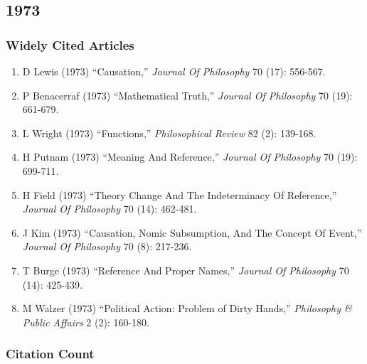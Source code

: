 \documentclass[
  10pt,
  letterpaper,
  DIV=11,
  numbers=noendperiod,
  twoside]{scrartcl}
\providecommand{\tightlist}{%
  \setlength{\itemsep}{0pt}\setlength{\parskip}{0pt}}\usepackage{longtable,booktabs,array}
\begin{document}
\newpage

\subsection{1973}\label{sec-s1973}

\subsubsection*{Widely Cited Articles}\label{widely-cited-articles-17}

\begin{enumerate}
\def\labelenumi{\arabic{enumi}.}
\tightlist
\item
  D Lewis (1973) ``Causation,'' \emph{Journal Of Philosophy} 70 (17):
  556-567.
\item
  P Benacerraf (1973) ``Mathematical Truth,'' \emph{Journal Of
  Philosophy} 70 (19): 661-679.
\item
  L Wright (1973) ``Functions,'' \emph{Philosophical Review} 82 (2):
  139-168.
\item
  H Putnam (1973) ``Meaning And Reference,'' \emph{Journal Of
  Philosophy} 70 (19): 699-711.
\item
  H Field (1973) ``Theory Change And The Indeterminacy Of Reference,''
  \emph{Journal Of Philosophy} 70 (14): 462-481.
\item
  J Kim (1973) ``Causation, Nomic Subsumption, And The Concept Of
  Event,'' \emph{Journal Of Philosophy} 70 (8): 217-236.
\item
  T Burge (1973) ``Reference And Proper Names,'' \emph{Journal Of
  Philosophy} 70 (14): 425-439.
\item
  M Walzer (1973) ``Political Action: Problem of Dirty Hands,''
  \emph{Philosophy \& Public Affairs} 2 (2): 160-180.
\end{enumerate}

\subsubsection*{Citation Count}\label{sec-count-1973}
\end{document}
